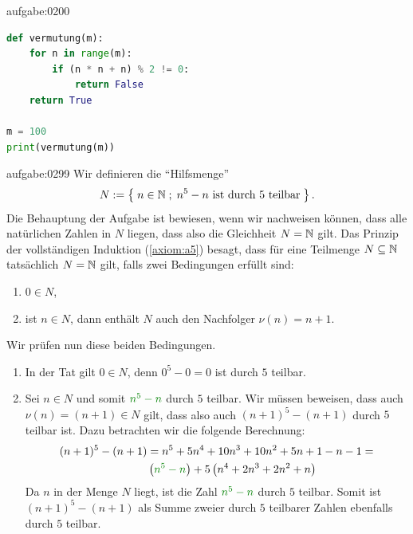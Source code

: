 

\begin{antwort}{aufgabe:0200}
\begin{lstlisting}[language=Python,caption=Vermutung überprüfen]
def vermutung(m):
    for n in range(m):
        if (n * n + n) % 2 != 0:
            return False
    return True

m = 100
print(vermutung(m))
\end{lstlisting}
\end{antwort}


\begin{antwort}{aufgabe:0299}
Wir definieren die \enquote{Hilfsmenge}
\begin{align*}
    N:=\left\{\;n\in\mathbb{N} \; ; \; \text{$n^5-n$ ist durch $5$ teilbar} \;\right\}.
\end{align*}
Die Behauptung der Aufgabe ist bewiesen, wenn wir nachweisen können, dass alle natürlichen Zahlen in $N$ liegen, dass also die Gleichheit $N=\mathbb{N}$ gilt. Das Prinzip der vollständigen Induktion (\cref{axiom:a5}) besagt, dass für eine Teilmenge $N\subseteq\mathbb{N}$ tatsächlich $N=\mathbb{N}$ gilt, falls zwei Bedingungen erfüllt sind:
\begin{enumerate}
    \item $0\in N$,
    \item ist $n\in N$, dann enthält $N$ auch den Nachfolger $\nu(n) = n+1$.
\end{enumerate}
Wir prüfen nun diese beiden Bedingungen.
\begin{enumerate}
    \item In der Tat gilt $0\in N$, denn $0^5-0 = 0$ ist durch $5$ teilbar. \checkmark
    \item Sei $n\in N$ und somit $\textcolor{Green}{n^5-n}$ durch $5$ teilbar. Wir müssen beweisen, dass auch $\nu(n)=(n+1)\in N$ gilt, dass also auch $(n+1)^5-(n+1)$ durch $5$ teilbar ist. Dazu betrachten wir die folgende Berechnung:
    \begin{align*}
        (n+1)^5-(n+1) &= n^5+5n^4+10n^3+10n^2+5n+1-n-1 = \\
        &\lr{\textcolor{Green}{n^5-n}} + 5\lr{n^4+2n^3+2n^2+n}
    \end{align*}
    Da $n$ in der Menge $N$ liegt, ist die Zahl $\textcolor{Green}{n^5-n}$ durch $5$ teilbar. Somit ist $(n+1)^5-(n+1)$ als Summe zweier durch $5$ teilbarer Zahlen ebenfalls durch $5$ teilbar. \checkmark
\end{enumerate}
\end{antwort}


